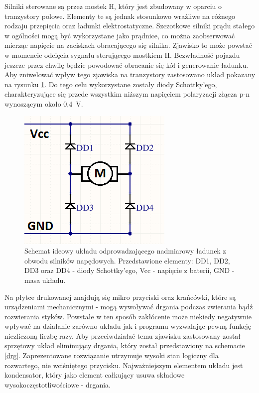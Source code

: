   Silniki sterowane są przez mostek H, który jest zbudowany w oparciu o tranzystory polowe. Elementy te są jednak stosunkowo wrażliwe na różnego rodzaju przepięcia oraz ładunki elektrostatyczne. Szczotkowe silniki prądu stałego w ogólności mogą być wykorzystane jako prądnice, co można zaobserwować mierząc napięcie na zaciskach obracającego się silnika. Zjawisko to może powstać w momencie odcięcia sygnału sterującego mostkiem H. Bezwładność pojazdu jeszcze przez chwilę będzie powodować obracanie się kół i generowanie ładunku. Aby zniwelować wpływ tego zjawiska na tranzystory zastosowano układ pokazany na rysunku \ref{diody}. Do tego celu wykorzystane zostały diody Schottky'ego, charakteryzujące się przede wszystkim niższym napięciem polaryzacji złącza p-n wynoszącym około 0,4~V.

  \begin{figure}[H]
    \begin{center}
      \includegraphics[scale=0.7]{imgs/silnik_pol.png}
 	\caption[Podłączenie silników napędowych.]{\small{Schemat ideowy układu odprowadzającego nadmiarowy ładunek z obwodu silników napędowych. Przedstawione elementy: DD1, DD2, DD3 oraz DD4 - diody Schottky'ego, Vcc - napięcie z baterii, GND - masa układu.}}
	\label{diody}
    \end{center}
  \end{figure}   
  
  Na płytce drukowanej znajdują się mikro przyciski oraz krańcówki, które są urządzeniami mechanicznymi - mogą wywoływać drgania podczas zwierania bądź rozwierania styków. Powstałe w ten sposób zakłócenie może niekiedy negatywnie wpływać na działanie zarówno układu jak i programu wyzwalając pewną funkcję niezliczoną liczbę razy. Aby przeciwdziałać temu zjawisku zastosowany został sprzętowy układ eliminujący drgania, który został przedstawiony na schemacie \ref{drg}. Zaprezentowane rozwiązanie utrzymuje wysoki stan logiczny dla rozwartego, nie wciśniętego przycisku. Najważniejszym elementem układu jest kondensator, który jako element całkujący usuwa składowe wysokoczęstotliwościowe - drgania. 
  
